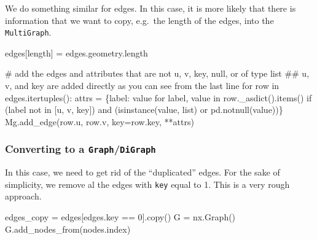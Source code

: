\documentclass[
  letterpaper,
  DIV=11,
  numbers=noendperiod]{scrreprt}
\newenvironment{Shaded}{\begin{snugshade}}{\end{snugshade}}
\newcommand{\BuiltInTok}[1]{\textcolor[rgb]{0.00,0.23,0.31}{#1}}
\newcommand{\CommentTok}[1]{\textcolor[rgb]{0.37,0.37,0.37}{#1}}
\newcommand{\ControlFlowTok}[1]{\textcolor[rgb]{0.00,0.23,0.31}{#1}}
\newcommand{\DecValTok}[1]{\textcolor[rgb]{0.68,0.00,0.00}{#1}}
\newcommand{\KeywordTok}[1]{\textcolor[rgb]{0.00,0.23,0.31}{#1}}
\newcommand{\NormalTok}[1]{\textcolor[rgb]{0.00,0.23,0.31}{#1}}
\newcommand{\OperatorTok}[1]{\textcolor[rgb]{0.37,0.37,0.37}{#1}}
\newcommand{\StringTok}[1]{\textcolor[rgb]{0.13,0.47,0.30}{#1}}
\begin{document}
We do something similar for edges. In this case, it is more likely that
there is information that we want to copy, e.g.~the length of the edges,
into the \texttt{MultiGraph}.

\begin{Shaded}
\begin{Highlighting}[]
\NormalTok{edges[}\StringTok{\textquotesingle{}length\textquotesingle{}}\NormalTok{] }\OperatorTok{=}\NormalTok{ edges.geometry.length}

\CommentTok{\# add the edges and attributes that are not u, v, key, null, or of type list}
\CommentTok{\#\# u, v, and key are added directly as you can see from the last line}
\ControlFlowTok{for}\NormalTok{ row }\KeywordTok{in}\NormalTok{ edges.itertuples():}
\NormalTok{    attrs }\OperatorTok{=}\NormalTok{ \{label: value }\ControlFlowTok{for}\NormalTok{ label, value }\KeywordTok{in}\NormalTok{ row.\_asdict().items() }\ControlFlowTok{if}\NormalTok{ (label }\KeywordTok{not} \KeywordTok{in}\NormalTok{ [}\StringTok{\textquotesingle{}u\textquotesingle{}}\NormalTok{, }\StringTok{\textquotesingle{}v\textquotesingle{}}\NormalTok{, }\StringTok{\textquotesingle{}key\textquotesingle{}}\NormalTok{]) }\KeywordTok{and} 
\NormalTok{             (}\BuiltInTok{isinstance}\NormalTok{(value, }\BuiltInTok{list}\NormalTok{) }\KeywordTok{or}\NormalTok{ pd.notnull(value))\}}
\NormalTok{    Mg.add\_edge(row.u, row.v, key}\OperatorTok{=}\NormalTok{row.key, }\OperatorTok{**}\NormalTok{attrs)}
\end{Highlighting}
\end{Shaded}

\subsubsection{\texorpdfstring{Converting to a
\texttt{Graph}/\texttt{DiGraph}}{Converting to a Graph/DiGraph}}\label{converting-to-a-graphdigraph}

In this case, we need to get rid of the ``duplicated'' edges. For the
sake of simplicity, we remove al the edges with \texttt{key} equal to 1.
This is a very rough approach.

\begin{Shaded}
\begin{Highlighting}[]
\NormalTok{edges\_copy }\OperatorTok{=}\NormalTok{ edges[edges.key }\OperatorTok{==} \DecValTok{0}\NormalTok{].copy()}
\NormalTok{G }\OperatorTok{=}\NormalTok{ nx.Graph()   }
\NormalTok{G.add\_nodes\_from(nodes.index)}
\end{Highlighting}
\end{Shaded}
\end{document}
